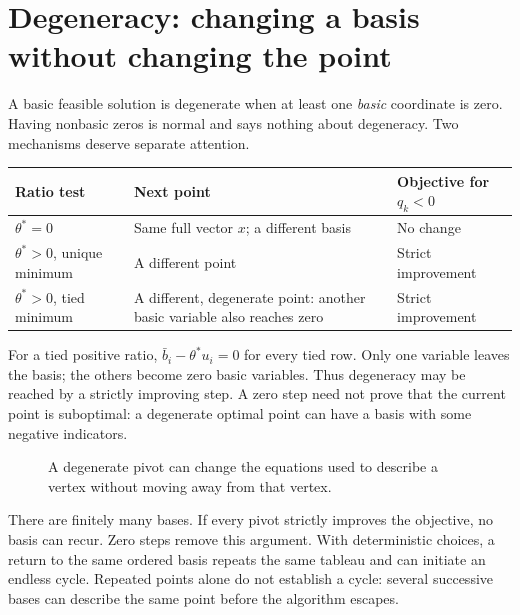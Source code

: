 \documentclass[11pt,a4paper]{article}
\begin{document}
\section{Degeneracy: changing a basis without changing the point}\label{sec:degeneracy}
A basic feasible solution is degenerate when at least one \emph{basic}
coordinate is zero. Having nonbasic zeros is normal and says nothing about
degeneracy. Two mechanisms deserve separate attention.
\begin{center}
  \begin{tabular}{>{\raggedright\arraybackslash}p{3.2cm}>{\raggedright\arraybackslash}p{5.3cm}>{\raggedright\arraybackslash}p{6cm}}\toprule
    Ratio test & Next point & Objective for $q_k<0$\\\midrule
    $\theta^*=0$ & Same full vector $x$; a different basis & No change\\
    $\theta^*>0$, unique minimum & A different point & Strict improvement\\
    $\theta^*>0$, tied minimum & A different, degenerate point: another basic variable also reaches zero & Strict improvement\\\bottomrule
  \end{tabular}
\end{center}
For a tied positive ratio, $\bar b_i-\theta^*u_i=0$ for every tied row.
Only one variable leaves the basis; the others become zero basic variables.
Thus degeneracy may be reached by a strictly improving step.
A zero step need not prove that the current point is suboptimal: a degenerate
optimal point can have a basis with some negative indicators.

\begin{figure}[H]
  \centering
  \caption{A degenerate pivot can change the equations used to describe a vertex
    without moving away from that vertex.}
\end{figure}
There are finitely many bases. If every pivot strictly improves the objective,
no basis can recur. Zero steps remove this argument. With deterministic choices,
a return to the same ordered basis repeats the same tableau and can initiate
an endless cycle. Repeated points alone do not establish a cycle: several
successive bases can describe the same point before the algorithm escapes.
\end{document}
